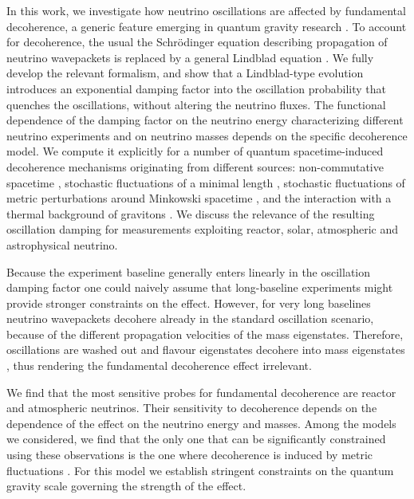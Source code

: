 \documentclass[11pt]{article}
\begin{document}
In this work, we investigate how neutrino oscillations are affected by fundamental decoherence, a generic feature emerging in quantum gravity research \cite{Arzano:2022nlo,Petruzziello:2020wkd,Breuer:2008rh, Diosi1984, Percival:1995an, Gambini:2004de, Bassi:2017szd}. To account for decoherence, the usual the Schr\"{o}dinger equation describing propagation of neutrino wavepackets is replaced by a general Lindblad equation \cite{Lindblad1976}. 
We fully develop the relevant formalism, and show that a Lindblad-type evolution introduces an exponential damping factor into the oscillation probability that quenches the oscillations, without altering the neutrino fluxes. The functional dependence of the damping factor on the neutrino energy characterizing different neutrino experiments and on neutrino masses depends on the specific decoherence model. We compute it explicitly for a number of quantum spacetime-induced decoherence mechanisms originating from different sources: non-commutative spacetime \cite{Arzano:2022nlo}, stochastic fluctuations of a minimal length \cite{Petruzziello:2020wkd}, stochastic fluctuations of metric perturbations around Minkowski spacetime \cite{Breuer:2008rh}, and the interaction with a thermal background of gravitons \cite{Blencowe:2012mp}. We discuss the relevance of the resulting oscillation damping for measurements exploiting reactor, solar, atmospheric and astrophysical neutrino. 

Because the experiment baseline generally enters linearly in the oscillation damping factor one could naively assume that long-baseline experiments might provide stronger constraints on the effect. However, for very long baselines neutrino wavepackets decohere already in the standard oscillation scenario, because of the different propagation velocities of the mass eigenstates. Therefore, oscillations are washed out and flavour eigenstates decohere into mass eigenstates \cite{Farzan:2008eg,Akhmedov:2009rb, Addazi2022, Giunti:1997wq}, thus rendering the fundamental decoherence effect irrelevant. 

We find that the most sensitive probes for fundamental decoherence are reactor and atmospheric neutrinos. Their sensitivity to decoherence depends on the dependence of the effect on the neutrino energy and masses.
Among the models we considered, we find that the only one that can be significantly constrained using these observations is the one where decoherence is induced by metric fluctuations \cite{Breuer:2008rh}. For this model we establish stringent constraints on the quantum gravity scale governing the strength of the effect. 
\end{document}
